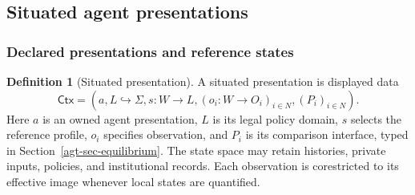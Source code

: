 \documentclass[11pt,a4paper]{article}
\numberwithin{equation}{section}
\theoremstyle{definition}
\newtheorem{definition}[theorem]{Definition}
\theoremstyle{remark}
\theoremstyle{plain}
\providecommand{\ctx}{\mathsf{Ctx}}
\begin{document}
\subsection{Situated agent presentations}
\label{agt-sec-situated}

\subsubsection{Declared presentations and reference states}

\begin{definition}[Situated presentation]
A situated presentation is displayed data
\[
 \ctx=(a,L\hookrightarrow\Sigma,s:W\to L,
       (o_i:W\to O_i)_{i\in N},(P_i)_{i\in N}).
\]
Here $a$ is an owned agent presentation, $L$ is its legal policy domain,
$s$ selects the reference profile, $o_i$ specifies observation, and $P_i$
is its comparison interface, typed in Section~\ref{agt-sec-equilibrium}.
The state space may retain histories, private inputs, policies, and
institutional records. Each observation is corestricted to its effective
image whenever local states are quantified.
\end{definition}
\end{document}
